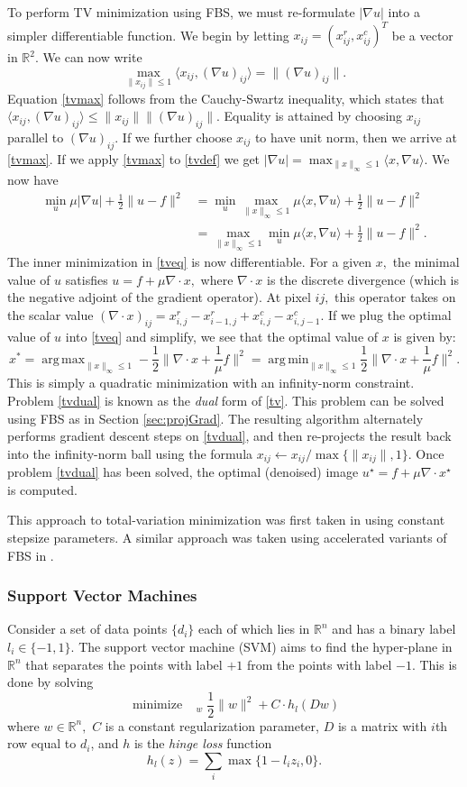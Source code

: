 \documentclass{amsart}
\newcommand{\half}{\frac{1}{2}}
\newcommand{\eqn}[2]{\begin{equation}\label{#1}#2\end{equation}}
\newcommand{\aln}[1]{\begin{align}#1\end{align}}
\newcommand{\ra}{\rangle}
\newcommand{\la}{\langle}
\newcommand{\opt}{^\star}
\newcommand{\reals}{\mathbb{R}}
\DeclareMathOperator*{\minimize}{minimize\quad}
\DeclareMathOperator*{\argmax}{arg\,max}
\DeclareMathOperator*{\argmin}{arg\,min}
\theoremstyle{definition}
\begin{document}
   To perform TV minimization using FBS, we must re-formulate $|\nabla u|$ into a simpler differentiable function.   We begin by letting $x_{ij}=(x_{ij}^r,x_{ij}^c)^T$ be a vector in $\reals^2.$  We can now write
    \eqn{tvmax}{
    \max_{\|x_{ij}\|\le1}  \la x_{ij}, (\nabla u)_{ij}\ra  =  \|  (\nabla u)_{ij}\|.
    }
    Equation \eqref{tvmax} follows from the Cauchy-Swartz inequality, which states that  $\la x_{ij}, (\nabla u)_{ij}\ra  \le \| x_{ij}\| \|  (\nabla u)_{ij}\|.$  Equality is attained by choosing $x_{ij}$ parallel to $(\nabla u)_{ij}$.  If we further choose $x_{ij}$ to have unit norm, then we arrive at \eqref{tvmax}.  If we apply \eqref{tvmax} to \eqref{tvdef}  we get ${|\nabla u| =  \max_{\|x\|_\infty \le1}  \la x, \nabla u\ra.}$ We now have
    \aln{
\min_u \mu |\nabla u| +\half \|u-f\|^2  &=    \min_u \max_{\|x\|_\infty \le1} \mu \la x, \nabla u\ra+ \half\|u-f\|^2 \nonumber \\
&=  \max_{\|x\|_\infty\le1} \min_u \mu\la x, \nabla u\ra+ \half \|u-f\|^2.  \label{tveq}
}
The inner minimization in \eqref{tveq} is now differentiable.  For a given $x,$ the minimal value of $u$ satisfies $u=f+\mu \nabla \cdot x,$ where $\nabla \cdot x$ is the discrete divergence (which is the negative adjoint of the gradient operator).  At pixel $ij,$ this operator takes on the scalar value ${(\nabla \cdot x)_{ij} = x^r_{i,j}-x^r_{i-1,j}+ x^c_{i,j}-x^c_{i,j-1}.}$  If we plug the optimal value of $u$ into \eqref{tveq} and simplify, we see that the optimal value of $x$ is given by:    
    \eqn{tvdual}{ 
    x^* = \argmax_{\|x\|_\infty\le1} -  \half \| \nabla \cdot x+\frac{1}{\mu}f\|^2= \argmin_{\|x\|_\infty\le1}  \half \| \nabla \cdot x+\frac{1}{\mu}f\|^2.
    }
This is simply a quadratic minimization with an infinity-norm constraint.  Problem \eqref{tvdual} is known as the {\em dual} form of \eqref{tv}.  This problem can be solved using FBS as in Section \eqref{sec:projGrad}.  The resulting algorithm alternately performs gradient descent steps on \eqref{tvdual}, and then re-projects the result back into the infinity-norm ball using the formula ${x_{ij} \leftarrow x_{ij}/\max\{\|x_{ij}\|,1\}.}$  Once problem \eqref{tvdual} has been solved, the optimal (denoised) image $u\opt=f+\mu \nabla \cdot x\opt$ is computed.  

This approach to total-variation minimization was first taken in \cite{Chambolle04} using constant stepsize parameters.  A similar approach was taken using accelerated variants of FBS in \cite{BT09:tv}.

\subsubsection{Support Vector Machines}  \label{sec:svm}
Consider a set of data points $\{d_i\}$ each of which lies in $\reals^n$ and has a binary label $l_i\in\{-1,1\}.$  The support vector machine (SVM) aims to find the hyper-plane in $\reals^n$ that separates the points with label $+1$ from the points with label $-1.$  This is done by solving 
  \eqn{svm}{
   \minimize_{w} \half\|w\|^2 + C\cdot h_l(Dw)
   }  
where $w\in \reals^n,$ $C$ is a constant regularization parameter, $D$ is a matrix with $i$th row equal to $d_i$, and $h$ is the {\em hinge loss} function 
 $$h_l(z) =\sum_i  \max\{1-l_i z_i,0\}.$$
 
\end{document}
